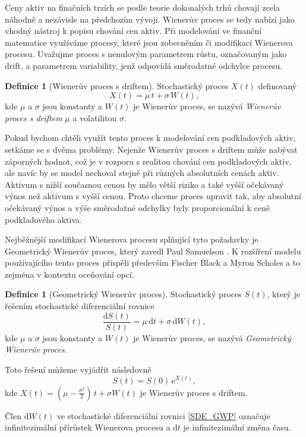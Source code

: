 \documentclass[a4paper,12pt]{report}
\theoremstyle{definition} \newtheorem{definice}[veta]{Definice}
\theoremstyle{remark}
\begin{document}
Ceny aktiv na finačních trzích se podle teorie dokonalých trhů chovají zcela náhodně a nezávisle na předchozím vývoji.
Wienerův proces se tedy nabízí jako vhodný nástroj k popisu chování cen aktiv.
Při modelování ve finanční matematice využíváme procesy, které jsou zobecněním či modifikací Wienerova procesu. 
Uvažujme proces s nenulovým parametrem růstu, označovaným jako drift, a parametrem variability, jenž odpovídá směrodatné odchylce procesu.
\begin{definice}[Wienerův proces s driftem]
Stochastický proces $X(t)$ definovaný 
$$X(t)  = \mu\, t + \sigma\, W (t),$$
kde $\mu$ a $\sigma$ jsou konstanty a $W (t)$ je Wienerův proces,
se nazývá \textit{Wienerův proces  s driftem} $\mu$ a volatilitou $\sigma$.
\end{definice}
Pokud bychom chtěli využít tento proces k modelování cen podkladových aktiv, setkáme se s dvěma problémy.
Nejenže Wienerův proces s driftem může nabývat záporných hodnot, což je v rozporu s realitou chování cen podkladových aktiv, ale navíc by se model nechoval stejně při různých absolutních cenách aktiv. 
Aktivum s nižší současnou cenou by mělo větší riziko a také vyšší očekávaný výnos než aktivum s vyšší cenou.
Proto chceme proces upravit tak, aby absolutní očekávaný výnos a výše směrodatné odchylky byly proporcionální k ceně podkladového aktiva. 

Nejběžnější modifikací Wienerova procesu splňující tyto požadavky je Geometrický Wienerův proces, který zavedl Paul Samuelson \cite{samuelson1964rational}.
K rozšíření modelu používajícího tento proces přispěli především Fischer Black a Myron Scholes \cite{black1973pricing} a to zejména v kontextu oceňování opcí.
\begin{definice}[Geometrický Wienerův proces]\label{Geometricky_Wieneruv_proces}
Stochastický proces $S(t)$, který je řešením stochastické diferenciální rovnice
\begin{equation}\label{SDE_GWP}
\frac{\mathrm{d} S(t)}{S(t)} = \mu\,\mathrm{d}t + \sigma\,\mathrm{d}W (t), 
\end{equation}
kde  $\mu$ a $\sigma$ jsou konstanty a $W (t)$ je Wienerův proces,
se nazývá \textit{Geometrický Wienerův proces}.

Toto řešení můžeme vyjádřit následovně
\begin{equation}\label{GWP}
S(t) = S(0)\,\mathrm{e}^{X(t)},
\end{equation}
kde $X(t) = (\mu - \frac{\sigma^2}{2})\,t + \sigma W (t)$ je Wienerův proces s driftem.
\end{definice}
Člen $\mathrm{d}W(t)$ ve stochastické diferenciální rovnici \eqref{SDE_GWP} označuje infinitezimální přírůstek Wienerova procesu a $\mathrm{d}t$ je infinitezimální změna času.
\end{document}
